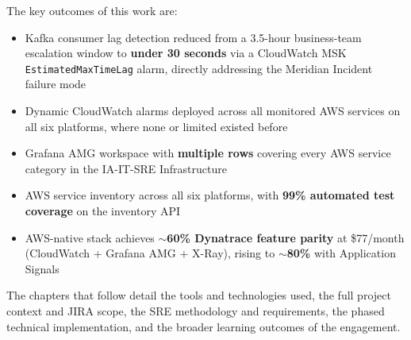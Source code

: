 The key outcomes of this work are:
\begin{itemize}
    \item Kafka consumer lag detection reduced from a 3.5-hour business-team
          escalation window to \textbf{under 30 seconds} via a CloudWatch MSK
          \texttt{EstimatedMaxTimeLag} alarm, directly addressing the
          Meridian Incident failure mode
    \item Dynamic CloudWatch alarms deployed across all monitored AWS services
          on all six platforms, where none or limited existed before
    \item Grafana AMG workspace with \textbf{multiple rows} covering every AWS
          service category in the IA-IT-SRE Infrastructure
    \item AWS service inventory across all six platforms, with
          \textbf{99\% automated test coverage} on the inventory API
    \item AWS-native stack achieves \textbf{$\sim$60\% Dynatrace feature
          parity} at \$77/month (CloudWatch + Grafana AMG + X-Ray), rising
          to \textbf{$\sim$80\%} with Application Signals
\end{itemize}

The chapters that follow detail the tools and technologies used, the full
project context and JIRA scope, the SRE methodology and requirements, the
phased technical implementation, and the broader learning outcomes of the
engagement.
